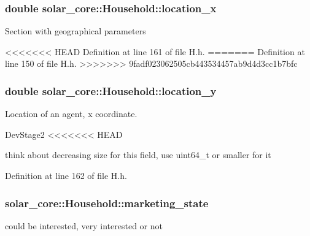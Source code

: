 \hypertarget{classsolar__core_1_1_household_a6596375631a366fdd24270f75548841f}{}
\subsubsection[{location\+\_\+x}]{\setlength{\rightskip}{0pt plus 5cm}double solar\+\_\+core\+::\+Household\+::location\+\_\+x}\label{classsolar__core_1_1_household_a6596375631a366fdd24270f75548841f}
Section with geographical parameters 

<<<<<<< HEAD
Definition at line 161 of file H.\+h.
=======
Definition at line 150 of file H.\+h.
>>>>>>> 9fadf023062505cb443534457ab9d4d3cc1b7bfc

\hypertarget{classsolar__core_1_1_household_a1ba6b7af82982096e05d99a70a2647eb}{}
\subsubsection[{location\+\_\+y}]{\setlength{\rightskip}{0pt plus 5cm}double solar\+\_\+core\+::\+Household\+::location\+\_\+y}\label{classsolar__core_1_1_household_a1ba6b7af82982096e05d99a70a2647eb}
Location of an agent, x coordinate.\begin{DoxyRefDesc}{Dev\+Stage2}
<<<<<<< HEAD
\item[\hyperlink{_dev_stage2__DevStage2000011}{Dev\+Stage2}]think about decreasing size for this field, use uint64\+\_\+t or smaller for it \end{DoxyRefDesc}


Definition at line 162 of file H.\+h.

\hypertarget{classsolar__core_1_1_household_a3ee8b2654cad46236d11f85a4ccd9574}{}
\subsubsection[{marketing\+\_\+state}]{ solar\+\_\+core\+::\+Household\+::marketing\+\_\+state\hspace{0.3cm}{\ttfamily [protected]}}\label{classsolar__core_1_1_household_a3ee8b2654cad46236d11f85a4ccd9574}
could be interested, very interested or not 


